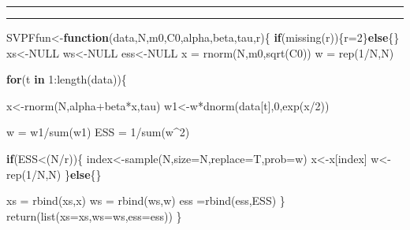 \documentclass[
]{book}
\newenvironment{Shaded}{\begin{snugshade}}{\end{snugshade}}
\newcommand{\AttributeTok}[1]{\textcolor[rgb]{0.77,0.63,0.00}{#1}}
\newcommand{\ConstantTok}[1]{\textcolor[rgb]{0.00,0.00,0.00}{#1}}
\newcommand{\ControlFlowTok}[1]{\textcolor[rgb]{0.13,0.29,0.53}{\textbf{#1}}}
\newcommand{\DecValTok}[1]{\textcolor[rgb]{0.00,0.00,0.81}{#1}}
\newcommand{\FunctionTok}[1]{\textcolor[rgb]{0.00,0.00,0.00}{#1}}
\newcommand{\NormalTok}[1]{#1}
\newcommand{\OtherTok}[1]{\textcolor[rgb]{0.56,0.35,0.01}{#1}}
\newcommand{\SpecialCharTok}[1]{\textcolor[rgb]{0.00,0.00,0.00}{#1}}
\theoremstyle{break}
\theoremstyle{nonumberplain}
\begin{document}
\hrule
\hrule

\hfill\break

\begin{Shaded}
\begin{Highlighting}[]
\NormalTok{SVPFfun}\OtherTok{\textless{}{-}}\ControlFlowTok{function}\NormalTok{(data,N,m0,C0,alpha,beta,tau,r)\{}
  \ControlFlowTok{if}\NormalTok{(}\FunctionTok{missing}\NormalTok{(r))\{r}\OtherTok{=}\DecValTok{2}\NormalTok{\}}\ControlFlowTok{else}\NormalTok{\{\}}
\NormalTok{  xs}\OtherTok{\textless{}{-}}\ConstantTok{NULL}
\NormalTok{  ws}\OtherTok{\textless{}{-}}\ConstantTok{NULL}
\NormalTok{  ess}\OtherTok{\textless{}{-}}\ConstantTok{NULL}
\NormalTok{  x  }\OtherTok{=} \FunctionTok{rnorm}\NormalTok{(N,m0,}\FunctionTok{sqrt}\NormalTok{(C0))}
\NormalTok{  w  }\OtherTok{=} \FunctionTok{rep}\NormalTok{(}\DecValTok{1}\SpecialCharTok{/}\NormalTok{N,N)}
  
  \ControlFlowTok{for}\NormalTok{(t }\ControlFlowTok{in} \DecValTok{1}\SpecialCharTok{:}\FunctionTok{length}\NormalTok{(data))\{}
    
\NormalTok{    x}\OtherTok{\textless{}{-}}\FunctionTok{rnorm}\NormalTok{(N,alpha}\SpecialCharTok{+}\NormalTok{beta}\SpecialCharTok{*}\NormalTok{x,tau)}
\NormalTok{    w1}\OtherTok{\textless{}{-}}\NormalTok{w}\SpecialCharTok{*}\FunctionTok{dnorm}\NormalTok{(data[t],}\DecValTok{0}\NormalTok{,}\FunctionTok{exp}\NormalTok{(x}\SpecialCharTok{/}\DecValTok{2}\NormalTok{))}
    
\NormalTok{    w }\OtherTok{=}\NormalTok{ w1}\SpecialCharTok{/}\FunctionTok{sum}\NormalTok{(w1)}
\NormalTok{    ESS  }\OtherTok{=} \DecValTok{1}\SpecialCharTok{/}\FunctionTok{sum}\NormalTok{(w}\SpecialCharTok{\^{}}\DecValTok{2}\NormalTok{)}
    
    \ControlFlowTok{if}\NormalTok{(ESS}\SpecialCharTok{\textless{}}\NormalTok{(N}\SpecialCharTok{/}\NormalTok{r))\{}
\NormalTok{      index}\OtherTok{\textless{}{-}}\FunctionTok{sample}\NormalTok{(N,}\AttributeTok{size=}\NormalTok{N,}\AttributeTok{replace=}\NormalTok{T,}\AttributeTok{prob=}\NormalTok{w)}
\NormalTok{      x}\OtherTok{\textless{}{-}}\NormalTok{x[index]}
\NormalTok{      w}\OtherTok{\textless{}{-}}\FunctionTok{rep}\NormalTok{(}\DecValTok{1}\SpecialCharTok{/}\NormalTok{N,N)}
\NormalTok{    \}}\ControlFlowTok{else}\NormalTok{\{\}}
    
\NormalTok{    xs }\OtherTok{=} \FunctionTok{rbind}\NormalTok{(xs,x)}
\NormalTok{    ws }\OtherTok{=} \FunctionTok{rbind}\NormalTok{(ws,w)}
\NormalTok{    ess }\OtherTok{=}\FunctionTok{rbind}\NormalTok{(ess,ESS)}
\NormalTok{  \}}
  \FunctionTok{return}\NormalTok{(}\FunctionTok{list}\NormalTok{(}\AttributeTok{xs=}\NormalTok{xs,}\AttributeTok{ws=}\NormalTok{ws,}\AttributeTok{ess=}\NormalTok{ess))}
\NormalTok{\}}
\end{Highlighting}
\end{Shaded}
\end{document}
